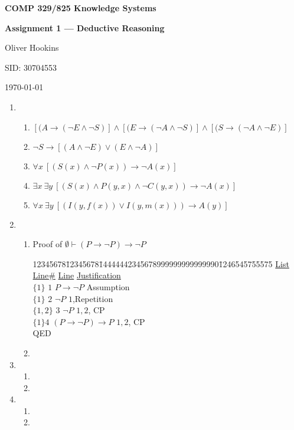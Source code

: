 
\setlength{\oddsidemargin}{0.0in}
\setlength{\evensidemargin}{0.0in}
\setlength{\textheight}{8.5in}
\setlength{\textwidth}{6.0in}

\centerline{\huge\bf COMP 329/825 Knowledge Systems}
\vspace{1in}
\centerline{\LARGE\bf Assignment 1 --- Deductive Reasoning }
\vspace{3in}
\centerline{\LARGE Oliver Hookins}
\vspace{5mm}
\centerline{\Large SID: 30704553}
\vspace{1in}
\centerline{\today}

\newpage

\begin{enumerate}
\item
\begin{enumerate}
\item
$[(A \rightarrow (\neg E \wedge \neg S)] \wedge [(E \rightarrow (\neg A \wedge \neg S)] \wedge [(S \rightarrow (\neg A \wedge \neg E)]$
\item
$\neg S \rightarrow [(A \wedge \neg E)\vee(E \wedge \neg A)]$
\item
$\forall x\ [(S(x) \wedge \neg P(x)) \rightarrow \neg A(x)]$
\item
$\exists x\ \exists y\ [(S(x) \wedge P(y,x) \wedge \neg C(y,x)) \rightarrow \neg A(x)]$
\item
$\forall x\ \exists y\ [(I(y,f(x)) \vee I(y,m(x))) \rightarrow A(y)]$
\end{enumerate}
\item
\begin{enumerate}
\item
Proof of
$\emptyset\vdash (P\rightarrow\neg P)\rightarrow\neg P$

\begin{tabbing}
12345678\=12345678\=14444442345678999999999999990\=1246545755575\kill
\underline{List} \> \underline{Line\#} \> \underline{Line} \> 
\underline{Justification} \\
$\{1\}$\> $1$ \> $P\rightarrow \neg P$\> Assumption \\
$\{1\}$\> $2$ \> $\neg P$\> $1$,Repetition \\
$\{1,2\}$\> $3$ \> $\neg P$\> $1, 2$, CP \\
$\{1\}$\>$4$ \> $(P\rightarrow \neg P)\rightarrow P$\> $1, 2$, CP \\
{} \> {} \> {} \> QED
\end{tabbing}


\item
\end{enumerate}

\item
\begin{enumerate}
\item
\item
\end{enumerate}
\item
\begin{enumerate}
\item
\item
\end{enumerate}
\end{enumerate}


